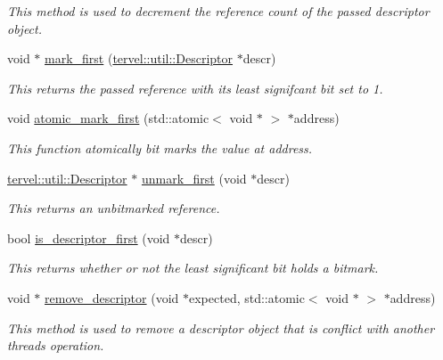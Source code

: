 \begin{DoxyCompactItemize}
\begin{DoxyCompactList}\small\item\em This method is used to decrement the reference count of the passed descriptor object. \end{DoxyCompactList}\item 
void $\ast$ \hyperlink{namespacetervel_1_1util_1_1memory_1_1rc_a084b51c075ff02fb2d858097b764827c}{mark\+\_\+first} (\hyperlink{classtervel_1_1util_1_1_descriptor}{tervel\+::util\+::\+Descriptor} $\ast$descr)
\begin{DoxyCompactList}\small\item\em This returns the passed reference with its least signifcant bit set to 1. \end{DoxyCompactList}\item 
void \hyperlink{namespacetervel_1_1util_1_1memory_1_1rc_a62b15d973adb1f7f052dd96e06f55e2f}{atomic\+\_\+mark\+\_\+first} (std\+::atomic$<$ void $\ast$ $>$ $\ast$address)
\begin{DoxyCompactList}\small\item\em This function atomically bit marks the value at address. \end{DoxyCompactList}\item 
\hyperlink{classtervel_1_1util_1_1_descriptor}{tervel\+::util\+::\+Descriptor} $\ast$ \hyperlink{namespacetervel_1_1util_1_1memory_1_1rc_aaae87a0d05d8fe85f02f711235fc5db5}{unmark\+\_\+first} (void $\ast$descr)
\begin{DoxyCompactList}\small\item\em This returns an unbitmarked reference. \end{DoxyCompactList}\item 
bool \hyperlink{namespacetervel_1_1util_1_1memory_1_1rc_ad86ec07a1f739e0bea27c852b160ba5b}{is\+\_\+descriptor\+\_\+first} (void $\ast$descr)
\begin{DoxyCompactList}\small\item\em This returns whether or not the least significant bit holds a bitmark. \end{DoxyCompactList}\item 
void $\ast$ \hyperlink{namespacetervel_1_1util_1_1memory_1_1rc_a21ef9046ee5ae16d7904833a54812309}{remove\+\_\+descriptor} (void $\ast$expected, std\+::atomic$<$ void $\ast$ $>$ $\ast$address)
\begin{DoxyCompactList}\small\item\em This method is used to remove a descriptor object that is conflict with another threads operation. \end{DoxyCompactList}\item 

\end{DoxyCompactItemize}

